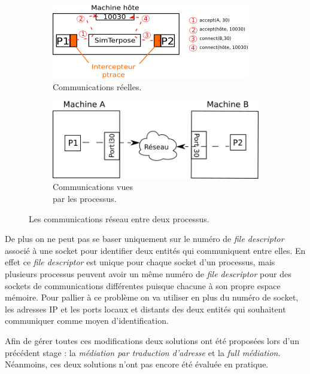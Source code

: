 \begin{figure}[H]
  \centering
  \begin{subfigure}{0.5\textwidth}
    \includegraphics[scale=0.8]{Pictures/png/Mediation_realite}
    \caption{Communications réelles.}
  \label{COMM_REALITE}
  \end{subfigure}
  \begin{subfigure}{0.25\textwidth}
  \includegraphics[scale=0.5]{Pictures/png/Mediation_VM}
  \caption{Communications vues \\ par les processus.}
  \label{COMM_VM}
  \end{subfigure}
  \caption{Les communications réseau entre deux processus.}
  \label{COMM}
\end{figure}

De plus on ne peut pas se baser uniquement sur le numéro de \textit{file
  descriptor} associé à une socket pour identifier deux entités qui communiquent
entre elles. En effet ce \textit{file descriptor} est unique pour chaque socket
d'un processus, mais plusieurs processus peuvent avoir un même numéro de
\textit{file descriptor} pour des sockets de communications différentes puisque
chacune à son propre espace mémoire. Pour pallier à ce problème on va utiliser
en plus du numéro de socket, les adresses IP et les ports locaux et distants des
deux entités qui souhaitent communiquer comme moyen d'identification.

Afin de gérer toutes ces modifications deux solutions ont été proposées lors
d'un précédent stage \citep{GUILLAUME:Interceptionsyscall}: la \textit{médiation
  par traduction d'adresse} et la \textit{full médiation}. Néanmoins, ces deux
solutions n'ont pas encore été évaluée en pratique.

